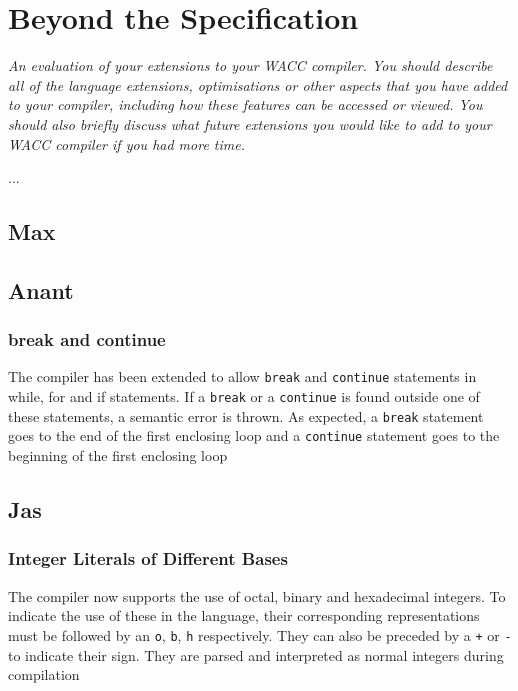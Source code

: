\documentclass[]{article}
\newcommand{\spec}[1]{\textit{#1}\par\noindent}
\begin{document}
\section{Beyond the Specification}
\spec{An evaluation of your extensions to your WACC compiler. You should describe all of the language extensions, optimisations or other aspects that you have added to your compiler, including how these features can be accessed or viewed. You should also briefly discuss what future extensions you would like to add to your WACC compiler if you had more time.}
...
\subsection{Max}



\subsection{Anant}
\subsubsection{break and continue}
{The compiler has been extended to allow {\tt break} and {\tt continue} statements in while, for and if statements. If a {\tt break} or a {\tt continue} is found outside one of these statements, a semantic error is thrown. As expected, a {\tt break} statement goes to the end of the first enclosing loop and a {\tt continue} statement goes to the beginning of the first enclosing loop}


\subsection{Jas}
\subsubsection{Integer Literals of Different Bases} {The compiler now supports the use of octal, binary and hexadecimal integers. To indicate the use of these in the language, their corresponding representations must be followed by an {\tt o}, {\tt b}, {\tt h} respectively. They can also be preceded by a {\tt +} or {\tt -} to indicate their sign. They are parsed and interpreted as normal integers during compilation}
\end{document}
